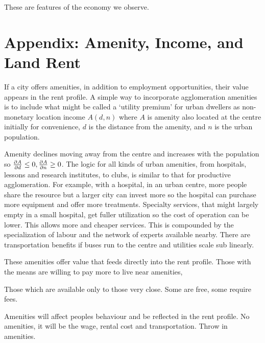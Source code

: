 These are features of the economy we observe.

\chapter*{Appendix: Amenity, Income, and Land Rent}


If a city offers amenities, in addition to employment opportunities, their value appears in the rent profile. A simple way to incorporate agglomeration amenities is to include what might be called a `utility premium' for urban dwellers as non-monetary location income $A(d,n)$ where $A$ is amenity also located at the centre initially for convenience, $d$ is the distance from the amenity, and $n$ is the urban population. 

Amenity declines moving away from the centre and increases with the population so $\frac{\partial A}{\partial d}\leq 0,\frac{\partial A}{\partial n}\geq 0$. The logic for all kinds of urban amenities, from hospitals, lessons and research institutes, to clubs,  is similar to that for productive agglomeration. For example, with a hospital, in an urban centre, more people share the resource but a larger city can invest more so the hospital can purchase more equipment and offer more treatments. %
Specialty services, that might largely empty in a small hospital, get fuller utilization so the cost of operation can be lower. This allows more and cheaper services. This is compounded by the specialization of labour and the network of experts available nearby. There are transportation benefits if buses run to the centre and utilities scale sub linearly.

These amenities offer value that feeds directly into the rent profile. Those with the means are willing to pay more to live near amenities, 


 

Those which are available only to those very close. Some are free, some require fees. 


Amenities will affect peoples behaviour and be reflected in the rent profile. No amenities, it will be the wage, rental cost and transportation.
Throw in amenities. 



